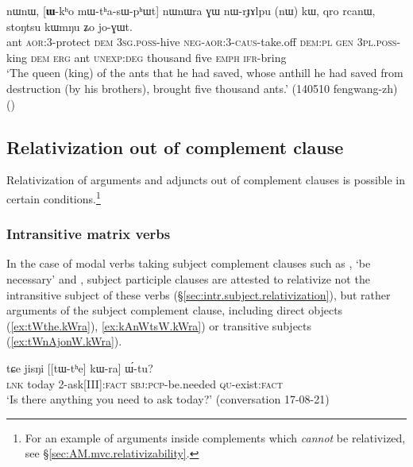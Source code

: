 \begin{exe}
\ex \label{ex:Wkho.mWthasWphWt}
 nɯnɯ, [\textbf{ɯ}-kʰo mɯ-tʰa-sɯ-pʰɯt] nɯnɯra ɣɯ nɯ-rɟɤlpu (nɯ) kɯ, qro rcanɯ, stoŋtsu kɯmŋu ʑo jo-ɣɯt. \\
ant \textsc{aor}:3\flobv{}-protect \textsc{dem} \textsc{3sg}.\textsc{poss}-hive \textsc{neg}-\textsc{aor}:3\flobv{}-\textsc{caus}-take.off \textsc{dem}:\textsc{pl} \textsc{gen} \textsc{3pl}.\textsc{poss}-king \textsc{dem} \textsc{erg} ant \textsc{unexp}:\textsc{deg} thousand five \textsc{emph} \textsc{ifr}-bring \\
\glt `The queen (king) of the ants that he had saved, whose anthill he had saved from destruction (by his brothers), brought five thousand ants.' (140510 fengwang-zh)
()
\end{exe}

  
 
 
\subsection{Relativization out of complement clause} \label{sec:out.complement.relativization}
Relativization of arguments and adjuncts out of complement clauses is possible in certain conditions.\footnote{For an example of arguments  inside complements which \textit{cannot} be relativized, see §\ref{sec:AM.mvc.relativizability}.  }

\subsubsection{Intransitive matrix verbs}  \label{sec:out.complement.relativization.intr}
In the case of modal verbs taking subject complement clauses such as , `be necessary' and ,  subject participle clauses are attested to relativize not the intransitive subject of these verbs (§\ref{sec:intr.subject.relativization}), but rather arguments of the subject complement clause, including direct objects (\ref{ex:tWthe.kWra}), \ref{ex:kAnWtsW.kWra}) or transitive subjects (\ref{ex:tWnAjonW.kWra}).

\begin{exe}
\ex \label{ex:tWthe.kWra}
\gll tɕe jisŋi [[tɯ-tʰe] kɯ-ra] ɯ́-tu? \\
\textsc{lnk} today 2-ask[III]:\textsc{fact} \textsc{sbj}:\textsc{pcp}-be.needed \textsc{qu}-exist:\textsc{fact} \\
\glt `Is there anything you need to ask today?' (conversation 17-08-21)
\end{exe}

